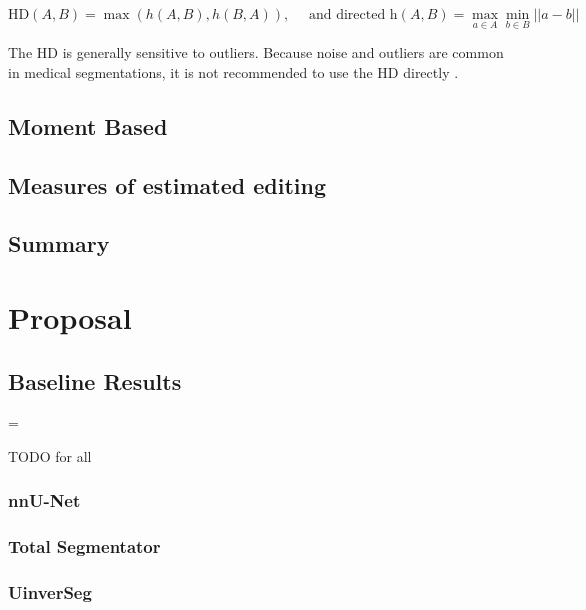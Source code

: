 \documentclass[11pt,twoside]{report}
\newenvironment{warning}
  {\par\begin{mdframed}[linewidth=1pt,linecolor=black]%
    \begin{list}{}{\leftmargin=1cm
                   \labelwidth=\leftmargin}\item[\Large\ding{43}]}
  {\end{list}\end{mdframed}\par}
\begin{document}
\begin{equation*}
  \text{HD}(A,B) = \max(h(A,B), h(B,A)), \quad \text{ and directed h}(A,B)=\max_{a\in A}\min_{b \in B} ||a-b||
\end{equation*}

The HD is generally sensitive to outliers. Because noise and outliers are common in medical segmentations, it is not recommended to use the HD directly \cite{boundary-overlap-metrics}.


\section{Moment Based}

\section{Measures of estimated editing}

\section{Summary}



\chapter{Proposal}\label{sect:proposal}

\section{Baseline Results}\label{sect:baseline-results}

\begin{warning}
  TODO for all
\end{warning}

\subsection{nnU-Net}\label{sect:results-nnu-net}

\subsection{Total Segmentator}\label{sect:results-totalseg}

\subsection{UinverSeg}\label{sect:results-universeg}
\end{document}
